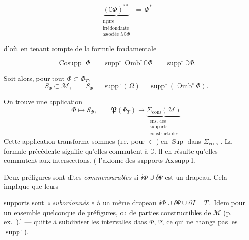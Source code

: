 \documentclass[11pt,a4paper]{article}
\begin{document}

\[
  \underbrace{(\complement\Phi)^{**}}_{\substack{\text{figure}\\ \text{irrédondante}\\ \text{associée à } \complement\Phi}} \;=\; \Phi^{*}
\]

d'où, en tenant compte de la formule fondamentale 

\[
  \boxed{\operatorname{Cosupp}^{\circ}\Phi \;=\; \operatorname{supp}^{\circ}\operatorname{Omb}^{\circ}\complement\Phi \;=\; \operatorname{supp}^{\circ}\complement\Phi .}
\]

Soit alors, pour tout $\Phi\subset\Phi_T$,
\[
  S_\Phi\subset\mathcal{M}, \qquad S_\Phi=\operatorname{supp}^{\circ}(\Omega) =\operatorname{supp}^{\circ}(\operatorname{Omb}^{\circ}\Phi) .
\]

On trouve une application
\[
  \Phi\longmapsto S_\Phi, \qquad \mathfrak{P}(\Phi_T)\longrightarrow \underbrace{\Sigma_{\mathrm{cons}}(\mathcal{M})}_{\substack{\text{ens. des}\\ \text{supports}\\ \text{constructibles}}}
\]
Cette application transforme  \ill{} sommes (i.e.  pour $\subset$) en $\operatorname{Sup}$ dans $\Sigma_{\mathrm{cons}}$ . La formule précédente signifie qu'elles commutent à $\complement$. Il en résulte qu'elles commutent aux intersections. ( l'axiome des supports Ax\,supp\,1.

Deux  préfigures \add{$\Phi,\Psi$} sont dites \textit{commensurables} si $\delta\Phi\cup\delta\Psi$ est un drapeau. Cela  implique que leurs

supports  sont \textit{« subordonnés »} à un même drapeau $\delta\Phi\cup\delta\Psi\cup\partial I=T$. [Idem pour un ensemble quelconque de préfigures, ou de parties constructibles de $\mathcal{M}$ (p.\,ex.\ ).]  — quitte à subdiviser les intervalles  dans $\Phi$, $\Psi$, ce qui ne change pas les $\operatorname{supp}^{\circ}$).
\end{document}
